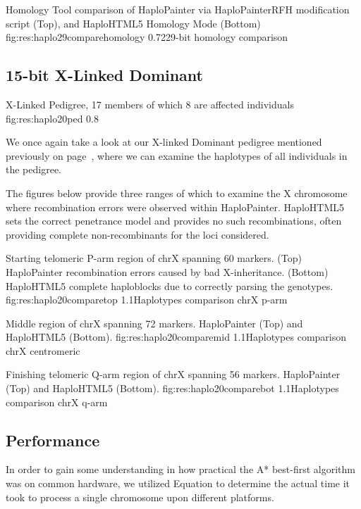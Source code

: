 	{Homology Tool comparison of HaploPainter via HaploPainterRFH modification script (Top), and HaploHTML5 Homology Mode (Bottom)}
	{fig:res:haplo29comparehomology}
	{0.72}{29-bit homology comparison}

\subsection{15-bit X-Linked Dominant}

	{X-Linked Pedigree, 17 members of which 8 are affected individuals}
	{fig:res:haplo20ped}
	{0.8}{}

We once again take a look at our X-linked Dominant pedigree mentioned previously on page~\pageref{fig:res:15summary}, where we can examine the haplotypes of all individuals in the pedigree.

The figures below provide three ranges of which to examine the X chromosome where recombination errors were observed within HaploPainter. HaploHTML5 sets the correct penetrance model and provides no such recombinations, often providing complete non-recombinants for the loci considered.


	{Starting telomeric P-arm region of chrX spanning 60 markers. (Top) HaploPainter recombination errors caused by bad X-inheritance. (Bottom) HaploHTML5 complete haploblocks due to correctly parsing the genotypes.}
	{fig:res:haplo20comparetop}
	{1.1}{Haplotypes comparison chrX p-arm}


	{Middle region of chrX spanning 72 markers. HaploPainter (Top) and HaploHTML5 (Bottom).}
	{fig:res:haplo20comparemid}
	{1.1}{Haplotypes comparison chrX centromeric}


	{Finishing telomeric Q-arm region of chrX spanning 56 markers. HaploPainter (Top) and HaploHTML5 (Bottom).}
	{fig:res:haplo20comparebot}
	{1.1}{Haplotypes comparison chrX q-arm}


\subsection{Performance}
\label{ref:res:jsperf}

In order to gain some understanding in how practical the A* best-first algorithm was on common hardware, we utilized Equation to determine the actual time it took to process a single chromosome upon different platforms.

